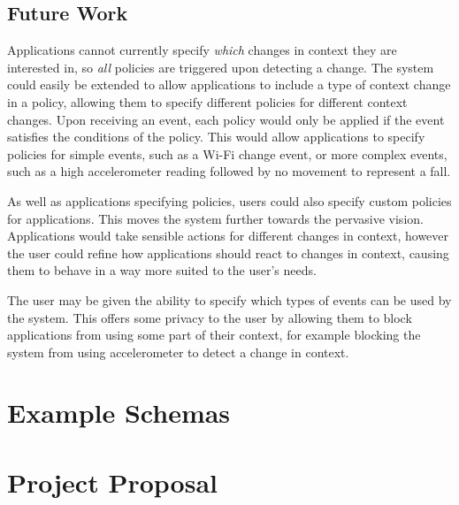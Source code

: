 \documentclass[12pt,twoside,notitlepage]{report}
\begin{document}
\section{Future Work}

Applications cannot currently specify {\sl which} changes in context they are interested in, so {\sl all} policies are triggered upon detecting a change.
The system could easily be extended to allow applications to include a type of context change in a policy, allowing them to specify different policies for different context changes. 
Upon receiving an event, each policy would only be applied if the event satisfies the conditions of the policy. 
This would allow applications to specify policies for simple events, such as a Wi-Fi change event, or more complex events, such as a high accelerometer reading followed by no movement to represent a fall. 

As well as applications specifying policies, users could also specify custom policies for applications. 
This moves the system further towards the pervasive vision. 
Applications would take sensible actions for different changes in context, however the user could refine how applications should react to changes in context, causing them to behave in a way more suited to the user's needs.

The user may be given the ability to specify which types of events can be used by the system. 
This offers some privacy to the user by allowing them to block applications from using some part of their context, for example blocking the system from using accelerometer to detect a change in context.

\cleardoublepage


\nocite{*}

\cleardoublepage

\begin{appendix}

\chapter{Example Schemas}



\cleardoublepage

\chapter{Project Proposal}



\end{appendix}
\end{document}
